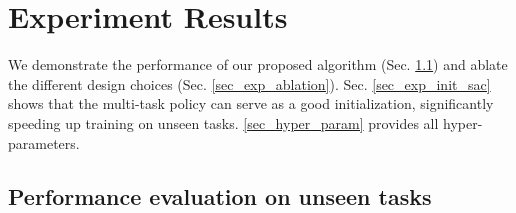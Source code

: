 \section{Experiment Results}\label{sec_exp}

\newcommand{\mujocobaselinefigsize}{0.143}

We demonstrate the performance of our proposed algorithm (Sec. \ref{sec_exp_eval}) and ablate the different design choices (Sec. \ref{sec_exp_ablation}). Sec. \ref{sec_exp_init_sac} shows that the multi-task policy can serve as a good initialization, significantly speeding up training on unseen tasks. \autoref{sec_hyper_param} provides all hyper-parameters.


\subsection{Performance evaluation on unseen tasks}\label{sec_exp_eval}


